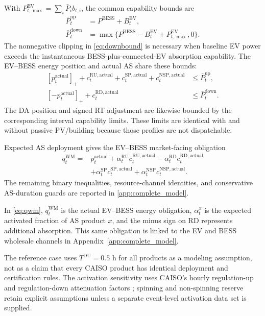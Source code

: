 \documentclass[final,5p,times]{elsarticle}
\newcommand{\EV}{\mathrm{EV}}
\newcommand{\BESS}{\mathrm{BESS}}
\newcommand{\RU}{\mathrm{RU}}
\newcommand{\RD}{\mathrm{RD}}
\newcommand{\SP}{\mathrm{SP}}
\newcommand{\NSP}{\mathrm{NSP}}
\newcommand{\WM}{\mathrm{WM}}
\newcommand{\actual}{\mathrm{actual}}
\newcommand{\pos}[1]{\left[#1\right]_{+}}
\begin{document}
With $P_{t,\max}^{\EV}=\sum_i\bar P_i b_{t,i}$, the common capability bounds are
\begin{align}
\bar P_t^{\mathrm{up}}&=P^{\BESS}+B_t^{\EV}, \label{eq:upbound}\\
\bar P_t^{\mathrm{down}}
&=\max\{P^{\BESS}-B_t^{\EV}+P_{t,\max}^{\EV},0\}. \label{eq:downbound}
\end{align}
The nonnegative clipping in \eqref{eq:downbound} is necessary when baseline EV
power exceeds the instantaneous BESS-plus-connected-EV absorption capability.
The EV--BESS energy position and actual AS share these bounds:
\begin{align}
\pos{p_t^{\actual}}+
c_t^{\RU,\actual}+c_t^{\SP,\actual}+c_t^{\NSP,\actual}
&\le\bar P_t^{\mathrm{up}}, \label{eq:up_envelope}\\
\pos{-p_t^{\actual}}+c_t^{\RD,\actual}
&\le\bar P_t^{\mathrm{down}}. \label{eq:down_envelope}
\end{align}
The DA position and signed RT adjustment are likewise bounded by the
corresponding interval capability limits. These limits are identical with and
without passive PV/building because those profiles are not dispatchable.

Expected AS deployment gives the EV--BESS market-facing obligation
\begin{align}
q_t^{\WM}={}&p_t^{\actual}
+\alpha_t^{\RU}c_t^{\RU,\actual}
-\alpha_t^{\RD}c_t^{\RD,\actual}\nonumber\\
&+\alpha_t^{\SP}c_t^{\SP,\actual}
+\alpha_t^{\NSP}c_t^{\NSP,\actual}. \label{eq:qwm}
\end{align}
The remaining binary inequalities, resource-channel identities, and conservative AS-duration
guards are reported in \ref{app:complete_model}.

In \eqref{eq:qwm}, $q_t^{\WM}$ is the actual EV--BESS energy obligation,
$\alpha_t^x$ is the expected activated fraction of AS product $x$, and the
minus sign on RD represents additional absorption. This same obligation is
linked to the EV and BESS wholesale channels in Appendix~\ref{app:complete_model}.

The reference case uses $T^{\mathrm{DU}}=0.5$ h for all products as a modeling
assumption, not as a claim that every CAISO product has identical deployment
and certification rules. The activation sensitivity uses CAISO's hourly
regulation-up and regulation-down attenuation factors
\cite{caisoAttenuation2025}; spinning and non-spinning reserve retain explicit
assumptions unless a separate event-level activation data set is supplied.
\end{document}
